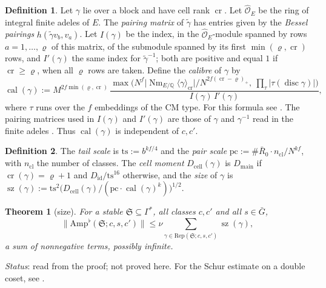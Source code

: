\documentclass[reqno]{amsart}
\theoremstyle{definition}
\newtheorem{definition}{Definition}[section]
\theoremstyle{plain}
\newtheorem{theorem}{Theorem}[section]
\theoremstyle{remark}
\newcommand{\Oc}{\mathcal O}
\newcommand{\Rb}{\bar R_0}
\newcommand{\Sf}{\mathfrak S}
\newcommand{\Amp}{\mathrm{Amp}}
\newcommand{\Did}{D_{\mathrm{id}}}
\newcommand{\Dmain}{D_{\mathrm{main}}}
\newcommand{\Dcell}{D_{\mathrm{cell}}}
\newcommand{\disc}{\operatorname{disc}}
\newcommand{\ts}{\mathrm{ts}}
\newcommand{\pc}{\mathrm{pc}}
\newcommand{\sz}{\operatorname{sz}}
\newcommand{\calb}{\operatorname{cal}}
\newcommand{\cri}{\operatorname{cr}}
\newcommand{\Rep}{\mathrm{Rep}}
\newcommand{\Nm}{\operatorname{Nm}}
\begin{document}
\begin{definition}\label{def:calibre}
Let \(\gamma\) lie over a block and have cell rank \(\cri\).  Let \(\hat{\Oc}_E\) be the ring of integral finite adeles of \(E\).  The \emph{pairing matrix} of \(\tilde\gamma\) has entries given by the \emph{Bessel pairings} \(h(\tilde\gamma v_b,v_a)\).  Let \(I(\gamma)\) be the index, in the \(\hat{\Oc}_E\)-module spanned by rows \(a=1,\dots,\varrho\) of this matrix, of the submodule spanned by its first \(\min(\varrho,\cri)\) rows, and \(I'(\gamma)\) the same index for \(\tilde\gamma^{-1}\); both are positive \cite[\texttt{LinkLattice.lean}, ll.~457, 464]{GL} and equal \(1\) if \(\cri\ge\varrho\), when all \(\varrho\) rows are taken.  Define the \emph{calibre} of \(\gamma\) by
\[
 \calb(\gamma):=M^{2f\min(\varrho,\cri)}\,\frac{\max\bigl(N^f\lvert\Nm_{E/\mathbb Q}\langle\gamma\rangle_{\cri}\rvert/N^{2f(\cri-\varrho)_+},\ \prod_\tau\lvert\tau(\disc\gamma)\rvert\bigr)}{I(\gamma)\,I'(\gamma)},
\]
where \(\tau\) runs over the \(f\) embeddings of the CM type.  For this formula see \cite[\texttt{Data.lean}, l.~74 and \texttt{BorderedDeterminant.lean}, l.~768]{GL}.  The pairing matrices used in \(I(\gamma)\) and \(I'(\gamma)\) are those of \(\gamma\) and \(\gamma^{-1}\) read in the finite adeles \cite[\texttt{Terms.lean}, l.~450]{GL}.  Thus \(\calb(\gamma)\) is independent of \(c,c'\).
\end{definition}

\begin{definition}\label{def:size}
The \emph{tail scale} is \(\ts:=b^{kf/4}\) and the \emph{pair scale} \(\pc:=\#\Rb\cdot n_{\mathrm{cl}}/N^{kf}\), with \(n_{\mathrm{cl}}\) the number of classes.  The \emph{cell moment} \(\Dcell(\gamma)\) is \(\Dmain\) if \(\cri(\gamma)=\varrho+1\) and \(\Did/\ts^{16}\) otherwise, and the \emph{size} of \(\gamma\) is \(\sz(\gamma):=\ts^2\bigl(\Dcell(\gamma)/(\pc\cdot\calb(\gamma)^k)\bigr)^{1/2}\).
\end{definition}

\begin{theorem}[size]\label{thm:size}
For a stable \(\Sf\subseteq\Gamma^*\), all classes \(c,c'\) and all \(s\in\bar G\),
\[
 \lVert\Amp^\flat(\Sf;c,s,c')\rVert\le\nu\sum_{\gamma\in\Rep(\Sf;c,s,c')}\sz(\gamma),
\]
a sum of nonnegative terms, possibly infinite.
\end{theorem}

\noindent\emph{Status}: read from the proof; not proved here.  For the Schur estimate on a double coset, see \cite[\texttt{SchurOrbit.lean}, l.~963]{GL}.
\end{document}
